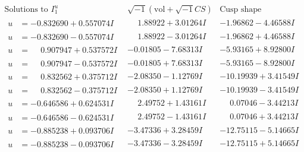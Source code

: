 \documentclass[1p]{elsarticle_modified}
\theoremstyle{definition}
\newcommand{\I}{\sqrt{-1}}
\begin{document}
$$\begin{array}{c|c|c}  
\text{Solutions to }I^u_{1}& \I (\text{vol} + \sqrt{-1}CS) & \text{Cusp shape}\\
 \hline 
\begin{aligned}
u &= -0.832690 + 0.557074 I\end{aligned}
 & \phantom{-}1.88922 + 3.01264 I & -1.96862 - 4.46588 I \\ \hline\begin{aligned}
u &= -0.832690 - 0.557074 I\end{aligned}
 & \phantom{-}1.88922 - 3.01264 I & -1.96862 + 4.46588 I \\ \hline\begin{aligned}
u &= \phantom{-}0.907947 + 0.537572 I\end{aligned}
 & -0.01805 - 7.68313 I & -5.93165 + 8.92800 I \\ \hline\begin{aligned}
u &= \phantom{-}0.907947 - 0.537572 I\end{aligned}
 & -0.01805 + 7.68313 I & -5.93165 - 8.92800 I \\ \hline\begin{aligned}
u &= \phantom{-}0.832562 + 0.375712 I\end{aligned}
 & -2.08350 - 1.12769 I & -10.19939 + 3.41549 I \\ \hline\begin{aligned}
u &= \phantom{-}0.832562 - 0.375712 I\end{aligned}
 & -2.08350 + 1.12769 I & -10.19939 - 3.41549 I \\ \hline\begin{aligned}
u &= -0.646586 + 0.624531 I\end{aligned}
 & \phantom{-}2.49752 + 1.43161 I & \phantom{-}0.07046 - 3.44213 I \\ \hline\begin{aligned}
u &= -0.646586 - 0.624531 I\end{aligned}
 & \phantom{-}2.49752 - 1.43161 I & \phantom{-}0.07046 + 3.44213 I \\ \hline\begin{aligned}
u &= -0.885238 + 0.093706 I\end{aligned}
 & -3.47336 + 3.28459 I & -12.75115 - 5.14665 I \\ \hline\begin{aligned}
u &= -0.885238 - 0.093706 I\end{aligned}
 & -3.47336 - 3.28459 I & -12.75115 + 5.14665 I \\ \hline\begin{aligned}

\end{aligned}
\end{array}$$
\end{document}
